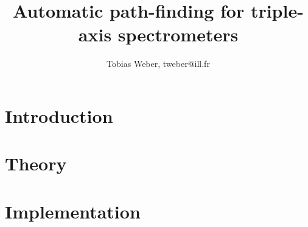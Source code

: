 \documentclass[english, 11pt]{book}
\begin{document}
\newcommand{\ill}{Institut Laue-Langevin (ILL), 71 avenue des Martyrs, CS 20156, 38042 Grenoble cedex 9, France}
\newcommand{\fuh}{Fernuniversit\"at in Hagen (FUH), Universit\"atsstraße 47, 58097 Hagen, Germany}


\title{Automatic path-finding for triple-axis spectrometers}
\author{Tobias Weber, tweber@ill.fr}

\maketitle
\tableofcontents









\chapter{Introduction}


\chapter{Theory}




\chapter{Implementation}


\appendix






\end{document}
